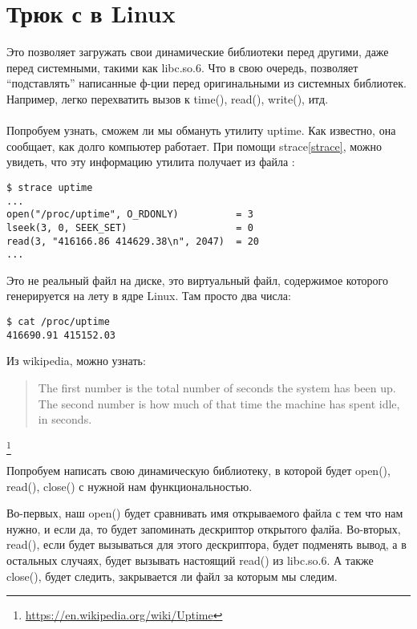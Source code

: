 \section{Трюк с  в Linux}


Это позволяет загружать свои динамические библиотеки перед другими, даже перед системными, такими как libc.so.6.
Что в свою очередь, позволяет ``подставлять'' написанные ф-ции перед оригинальными из системных библиотек.
Например, легко перехватить вызов к time(), read(), write(), итд. \\
\\
Попробуем узнать, сможем ли мы обмануть утилиту uptime. Как известно, она сообщает, как долго компьютер работает.
При помощи strace\ref{strace}, можно увидеть, что эту информацию утилита получает из файла :

\begin{lstlisting}
$ strace uptime 
...
open("/proc/uptime", O_RDONLY)          = 3
lseek(3, 0, SEEK_SET)                   = 0
read(3, "416166.86 414629.38\n", 2047)  = 20
...
\end{lstlisting}

Это не реальный файл на диске, это виртуальный файл, содержимое которого генерируется на лету в ядре Linux. 
Там просто два числа:

\begin{lstlisting}
$ cat /proc/uptime
416690.91 415152.03
\end{lstlisting}

Из wikipedia, можно узнать:

\begin{framed}
\begin{quotation}
The first number is the total number of seconds the system has been up. The second number is how much of that time the machine has spent idle, in seconds.
\end{quotation}
\end{framed}\footnote{\url{https://en.wikipedia.org/wiki/Uptime}}

Попробуем написать свою динамическую библиотеку, в которой будет open(), read(), close() с нужной нам функциональностью.

Во-первых, наш open() будет сравнивать имя открываемого файла с тем что нам нужно, и если да, то будет запоминать
дескриптор открытого фалйа. Во-вторых, read(), если будет вызываться для этого дескриптора, будет подменять вывод,
а в остальных случаях, будет вызывать настоящий read() из libc.so.6.
А также close(), будет следить, закрывается ли файл за которым мы следим.


